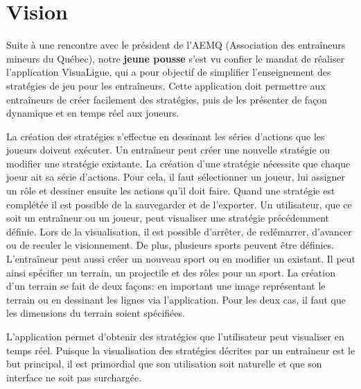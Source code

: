 
\chapter{Vision}
\label{s:vision}

Suite à une rencontre avec le président de l'AEMQ (Association des entraîneurs mineurs du Québec), notre \textbf{jeune pousse} s'est vu confier le mandat de réaliser l'application VisuaLigue, qui a pour objectif de simplifier l'enseignement des stratégies de jeu pour les entraîneurs.
Cette application doit permettre aux entraîneurs de créer facilement des stratégies, puis de les présenter de façon dynamique et en temps réel aux joueurs.

La cr\'eation des strat\'egies s'effectue en dessinant les s\'eries d'actions que les joueurs doivent ex\'ecuter.
Un entraîneur peut créer une nouvelle stratégie ou modifier une stratégie existante.
La création d'une stratégie nécessite que chaque joeur ait sa série d'actions.
Pour cela, il faut s\'electionner un joueur, lui assigner un r\^ole et dessiner ensuite les actions qu'il doit faire.
Quand une strat\'egie est compl\'et\'ee il est possible de la sauvegarder et de l'exporter.
Un utilisateur, que ce soit un entraîneur ou un joueur, peut visualiser une strat\'egie pr\'ec\'edemment d\'efinie.
Lors de la visualisation, il est possible d'arr\^eter, de red\'emarrer, d'avancer ou de reculer le visionnement.
De plus, plusieurs sports peuvent \^etre d\'efinies.
L'entraîneur peut aussi créer un nouveau sport ou en modifier un existant.
Il peut ainsi sp\'ecifier un terrain, un projectile et des r\^oles pour un sport.
La création d'un terrain se fait de deux façons: en important une image représentant le terrain ou en dessinant les lignes via l'application.
Pour les deux cas, il faut que les dimensions du terrain soient spécifiées.

L'application permet d'obtenir des strat\'egies que l'utilisateur peut visualiser en temps r\'eel.
Puisque la visualisation des stratégies décrites par un entraîneur est le but principal, il est primordial que son utilisation soit naturelle et que son interface ne soit pas surchargée.
